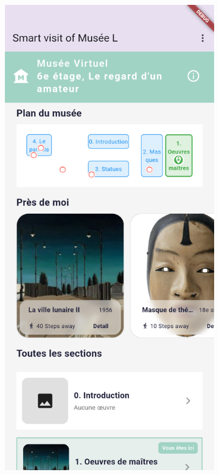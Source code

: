 \begin{figure}[h]
    \centering
    \begin{subfigure}[b]{0.33\linewidth}
        \includegraphics[width=\linewidth]{assets/application-homepage-top.png}

\end{subfigure}
\end{figure}
